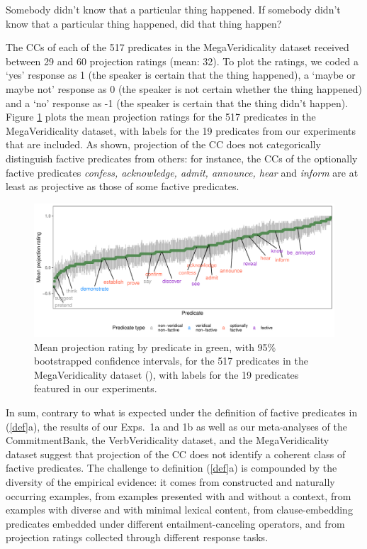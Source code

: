 \documentclass[11pt,fleqn]{article}
\newcommand{\6}{\mbox{$[\hspace*{-.6mm}[$}}
\newcommand{\9}{\mbox{$]\hspace*{-.6mm}]$}}
\begin{document}
\begin{exe}
\ex\label{wr-stim-proj}
\begin{xlist}
\ex Somebody didn't know that a particular thing happened.
\ex If somebody didn't know that a particular thing happened, did that thing happen?
\end{xlist}
\end{exe}

The CCs of each of the 517 predicates in the MegaVeridicality dataset received between 29 and 60 projection ratings (mean: 32). To plot the ratings, we coded a `yes' response as 1 (the speaker is certain that the thing happened),  a `maybe or maybe not' response as 0 (the speaker is not certain whether the thing happened) and a `no' response as -1 (the speaker is certain that the thing didn't happen). Figure \ref{f-white-rawlins-projectivity} plots the mean projection ratings for the 517 predicates in the MegaVeridicality dataset, with labels for the 19 predicates from our experiments that are included. As shown, projection of the CC does not categorically distinguish factive predicates from others: for instance, the CCs of the optionally factive predicates {\em confess, acknowledge, admit, announce, hear} and {\em inform} are at least as projective as those of some factive predicates. 

\begin{figure}[H]
\centering
\includegraphics[width=.77\paperwidth]{../../MegaVeridicality-analysis/graphs/means-projection-by-predicate}

\caption{Mean projection rating by predicate in green, with 95\% bootstrapped confidence intervals, for the 517 predicates in the MegaVeridicality dataset (\citealt{white-rawlins-nels2018,white-etal2018b}), with labels for the 19 predicates featured in our experiments.}
\label{f-white-rawlins-projectivity}
\end{figure}


In sum, contrary to what is expected under the definition of factive predicates in (\ref{def}a), the results of our Exps.~1a and 1b as well as our meta-analyses of the CommitmentBank, the VerbVeridicality dataset, and the MegaVeridicality dataset suggest that projection of the CC does not identify a coherent class of factive predicates. The challenge to definition (\ref{def}a) is compounded by the diversity of the empirical evidence: it comes from constructed and naturally occurring examples, from examples presented with and without a context, from examples with diverse and with minimal lexical content, from clause-embedding predicates embedded under different entailment-canceling operators, and from projection ratings collected through different response tasks. 
\end{document}
